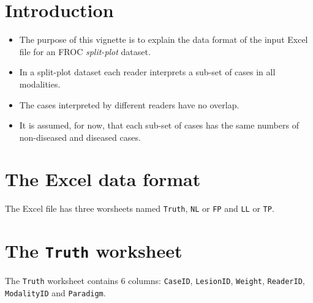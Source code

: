 \documentclass[]{book}
\providecommand{\tightlist}{%
  \setlength{\itemsep}{0pt}\setlength{\parskip}{0pt}}
\begin{document}
\hypertarget{introduction-3}{%
\section{Introduction}\label{introduction-3}}

\begin{itemize}
\tightlist
\item
  The purpose of this vignette is to explain the data format of the input Excel file for an FROC \emph{split-plot} dataset.
\item
  In a split-plot dataset each reader interprets a sub-set of cases in all modalities.
\item
  The cases interpreted by different readers have no overlap.
\item
  It is assumed, for now, that each sub-set of cases has the same numbers of non-diseased and diseased cases.
\end{itemize}

\hypertarget{the-excel-data-format-3}{%
\section{The Excel data format}\label{the-excel-data-format-3}}

The Excel file has three worsheets named \texttt{Truth}, \texttt{NL} or \texttt{FP} and \texttt{LL} or \texttt{TP}.

\hypertarget{the-truth-worksheet-3}{%
\section{\texorpdfstring{The \texttt{Truth} worksheet}{The Truth worksheet}}\label{the-truth-worksheet-3}}

The \texttt{Truth} worksheet contains 6 columns: \texttt{CaseID}, \texttt{LesionID}, \texttt{Weight}, \texttt{ReaderID}, \texttt{ModalityID} and \texttt{Paradigm}.
\end{document}
